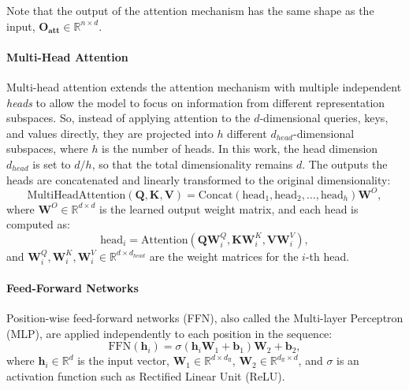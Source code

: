 Note that the output of the attention mechanism has the same shape as the input, $\mathbf{O_{att}} \in \mathbb{R}^{n \times d}$.

\paragraph{Multi-Head Attention}

Multi-head attention extends the attention mechanism with multiple independent \emph{heads} to allow the model to focus on information from different representation subspaces. So, instead of applying attention to the $d$-dimensional queries, keys, and values directly, they are projected into $h$ different $d_{head}$-dimensional subspaces, where $h$ is the number of heads. In this work, the head dimension $d_{head}$ is set to $d/h$, so that the total dimensionality remains $d$. The outputs the heads are concatenated and linearly transformed to the original dimensionality:
\begin{equation*}
    \text{MultiHeadAttention}(\mathbf{Q}, \mathbf{K}, \mathbf{V}) = \text{Concat}(\text{head}_1, \text{head}_2, \dots, \text{head}_h) \mathbf{W}^O,
\end{equation*}
where $\mathbf{W}^O \in \mathbb{R}^{d \times d}$ is the learned output weight matrix, and each head is computed as:
\begin{equation*}
    \text{head}_i = \text{Attention}(\mathbf{Q} \mathbf{W}_i^Q, \mathbf{K} \mathbf{W}_i^K, \mathbf{V} \mathbf{W}_i^V),
\end{equation*}
and $\mathbf{W}_i^Q, \mathbf{W}_i^K, \mathbf{W}_i^V \in \mathbb{R}^{d \times d_{head}}$ are the weight matrices for the $i$-th head.

\paragraph{Feed-Forward Networks}

Position-wise feed-forward networks (FFN), also called the Multi-layer Perceptron (MLP), are applied independently to each position in the sequence:
\begin{equation*}
    \text{FFN}(\mathbf{h}_i) = \sigma(\mathbf{h}_i \mathbf{W}_1 + \mathbf{b}_1) \mathbf{W}_2 + \mathbf{b}_2,
\end{equation*}
where $\mathbf{h}_i \in \mathbb{R}^d$ is the input vector, $\mathbf{W}_1 \in \mathbb{R}^{d \times d_{\text{ff}}}$, $\mathbf{W}_2 \in \mathbb{R}^{d_{\text{ff}} \times d}$, and $\sigma$ is an activation function such as Rectified Linear Unit (ReLU).

